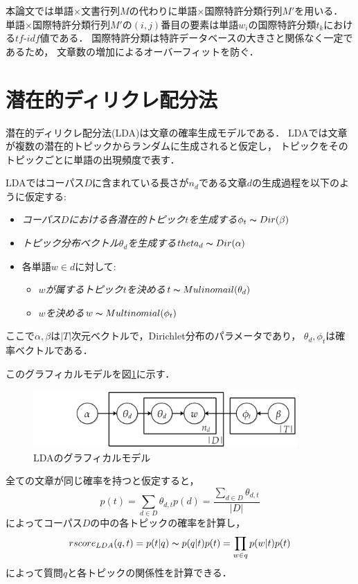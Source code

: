 \documentclass[master]{suribt}
\theoremstyle{definition}
\begin{document}
 本論文では単語$\times$文書行列$M$の代わりに単語$\times$国際特許分類行列$M'$を用いる．
 単語$\times$国際特許分類行列$M'$の$(i,j)$番目の要素は単語$w_i$の国際特許分類$t_k$における$tf\text{-}idf$値である．
 国際特許分類は特許データベースの大きさと関係なく一定であるため，
 文章数の増加によるオーバーフィットを防ぐ．

 \section{潜在的ディリクレ配分法}
 潜在的ディリクレ配分法(LDA)は文章の確率生成モデルである．
 LDAでは文章が複数の潜在的トピックからランダムに生成されると仮定し，
 トピックをそのトピックごとに単語の出現頻度で表す．

 
 LDAではコーパス$D$に含まれている長さが$n_d$である文章$d$の生成過程を以下のように仮定する:
 \begin{itemize}
 \item {\em コーパス$D$における各潜在的トピック$t$を生成する}$\phi_{t} \thicksim Dir(\beta)$
 \item {\em トピック分布ベクトル$\theta_d$を生成する}$theta_d \thicksim Dir(\alpha)$
 \item 各単語$w \in d$に対して:
  \begin{itemize}
   \item {\em $w$が属するトピック$t$を決める}$t \thicksim Mulinomail(\theta_d)$
   \item {\em $w$を決める}$w \thicksim Multinomial(\phi_{t})$
  \end{itemize}
 \end{itemize}
 
 ここで$\alpha,\beta$は$|T|$次元ベクトルで，Dirichlet分布のパラメータであり，
 $\theta_d,\phi_{t}$は確率ベクトルである．

 このグラフィカルモデルを図\ref{fig:LDA}に示す．
 \begin{figure}
 \includegraphics[width=0.9\textwidth,natwidth=557,natheight=141]{LDA.png}
 \caption{LDAのグラフィカルモデル}
 \label{fig:LDA}
 \end{figure}
 
 全ての文章が同じ確率を持つと仮定すると，
 \begin{equation}
 p(t) = \sum_{d \in D}\theta_{d,t}p(d) = \frac{\sum_{d \in D} \theta_{d,t}}{|D|}
 \end{equation}
 によってコーパス$D$の中の各トピックの確率を計算し，
 \begin{equation}
 rscore_{LDA}(q,t) = p(t|q) \thicksim p(q|t)p(t) = \prod_{w \in q}p(w|t)p(t)
 \end{equation}
 によって質問$q$と各トピックの関係性を計算できる．
\end{document}
